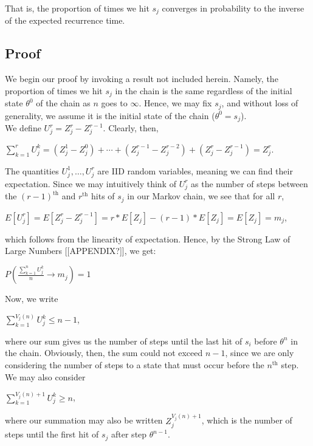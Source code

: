 \documentclass[12pt,twoside]{reedthesis}
\begin{document}
		That is, the proportion of times we hit $s_j$ converges in probability to the inverse of the expected recurrence time.
		
		\subsection*{Proof}
		We begin our proof by invoking a result not included herein. Namely, the proportion of times we hit $s_j$ in the chain is the same regardless of the initial state $\theta^0$ of the chain as $n$ goes to $\infty$. Hence, we may fix $s_j$, and without loss of generality, we assume it is the initial state of the chain ($\theta^0 = s_j$). \\
		
		We define $U_{j}^r = Z_{j}^{r} - Z_{j}^{r-1}$. Clearly, then,
		\begin{center}
		 $\displaystyle\sum_{k=1}^{r}U_j^k 
		 = (Z_j^1 - Z_j^0) + \cdots + (Z_j^{r-1} - Z_j^{r-2}) + (Z_j^r - Z_j^{r-1}) 
		 = Z_j^r$. 
		 \end{center}
		 The quantities $U_j^1, \ldots, U_j^r$ are IID random variables, meaning we can find their expectation. Since we may intuitively think of $U_j^r$ as the number of steps between the $(r-1)^{\textrm{th}}$ and $r^{\textrm{th}}$ hits of $s_j$ in our Markov chain, we see that for all $r$,
		\begin{center}
		$E[U_{j}^r] = E[Z_j^{r} - Z_j^{r-1}] = r *E[Z_j] - (r-1) *E[Z_j] = E[Z_j] = m_j$, 
		\end{center}
		which follows from the linearity of expectation.
		Hence, by the Strong Law of Large Numbers [[APPENDIX?]], we get: 
		\begin{center}
		$
		P\left(\displaystyle\frac{\sum_{k=1}^{n}U_j^k}{n} \rightarrow m_j \right) = 1
		$
		\end{center}
		Now, we write
		\begin{center}
		$\displaystyle\sum_{k=1}^{V_j(n)}U_j^k \leq n -1$, 
		\end{center}
		where our sum gives us the number of steps until the last hit of $s_i$ before $\theta^n$ in the chain.
		Obviously, then, the sum could not exceed $n -1$, since we are only considering the number of steps to a state that must occur before the $n^{\textrm{th}}$ step. We may also consider 
		\begin{center}
		$\displaystyle\sum_{k=1}^{V_j(n) + 1}U_j^k \geq n$,
		\end{center}
		where our summation may also be written $Z_j^{V_j(n) + 1}$, which is the number of steps until the first hit of $s_j$ after step $\theta^{n-1}$. 
\end{document}
